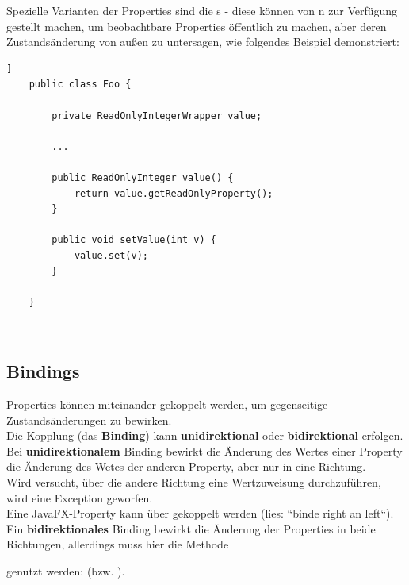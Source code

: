 \noindent
Spezielle Varianten der Properties sind die s - diese können von n zur Verfügung gestellt machen, um beobachtbare Properties öffentlich zu machen, aber deren Zustandsänderung von außen zu untersagen, wie folgendes Beispiel demonstriert:

\begin{verbatim}]
    public class Foo {

        private ReadOnlyIntegerWrapper value;

        ...

        public ReadOnlyInteger value() {
            return value.getReadOnlyProperty();
        }

        public void setValue(int v) {
            value.set(v);
        }

    }
\end{verbatim}\\

\subsection{Bindings}

Properties können miteinander gekoppelt werden, um gegenseitige Zustandsänderungen zu bewirken.\\

\noindent
Die Kopplung (das \textbf{Binding}) kann \textbf{unidirektional} oder \textbf{bidirektional} erfolgen.\\

\noindent
Bei \textbf{unidirektionalem} Binding bewirkt die Änderung des Wertes einer Property die Änderung des Wetes der anderen Property, aber nur in eine Richtung.\\
Wird versucht, über die andere Richtung eine Wertzuweisung durchzuführen, wird eine Exception geworfen.\\
Eine JavaFX-Property kann über  gekoppelt werden (lies: ``binde right an left``).\\

\noindent
Ein \textbf{bidirektionales} Binding bewirkt die Änderung der Properties in beide Richtungen, allerdings muss hier die Methode \begin{center}\end{center} genutzt werden:  (bzw. ).


